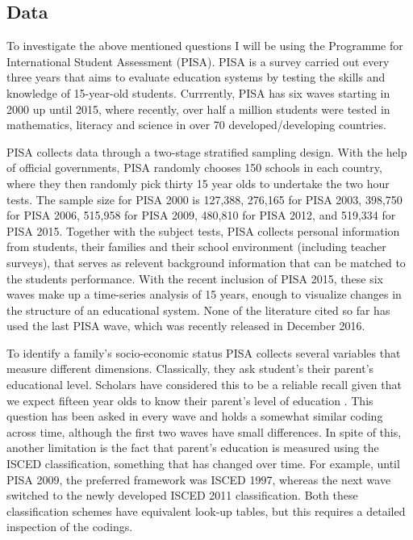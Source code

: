 \documentclass[11pt, a4paper]{article}\usepackage[]{graphicx}\usepackage[]{color}
\begin{document}
\subsection{Data}



To investigate the above mentioned questions I will be using the Programme for International Student Assessment (PISA). PISA is a survey carried out every three years that aims to evaluate education systems by testing the skills and knowledge of 15-year-old students. Currrently, PISA has six waves starting in 2000 up until 2015, where recently, over half a million students were tested in mathematics, literacy and science in over 70 developed/developing countries.

PISA collects data through a two-stage stratified sampling design. With the help of official governments, PISA randomly chooses 150 schools in each country, where they then randomly pick thirty 15 year olds to undertake the two hour tests. The sample size for PISA 2000 is 127,388, 276,165 for PISA 2003, 398,750 for PISA 2006, 515,958 for PISA 2009, 480,810 for PISA 2012, and 519,334 for PISA 2015. Together with the subject tests, PISA collects personal information from students, their families and their school environment (including teacher surveys), that serves as relevent background information that can be matched to the students performance. With the recent inclusion of PISA 2015, these six waves make up a time-series analysis of 15 years, enough to visualize changes in the structure of an educational system. None of the literature cited so far has used the last PISA wave, which was recently released in December 2016.

To identify a family's socio-economic status PISA collects several variables that measure different dimensions. Classically, they ask student's their parent's educational level. Scholars have considered this to be a reliable recall given that we expect fifteen year olds to know their parent's level of education \citep{reardon2011}. This question has been asked in every wave and holds a somewhat similar coding across time, although the first two waves have small differences. In spite of this, another limitation is the fact that parent's education is measured using the ISCED classification, something that has changed over time. For example, until PISA 2009, the preferred framework was ISCED 1997, whereas the next wave switched to the newly developed ISCED 2011 classification. Both these classification schemes have equivalent look-up tables, but this requires a detailed inspection of the codings.
\end{document}
